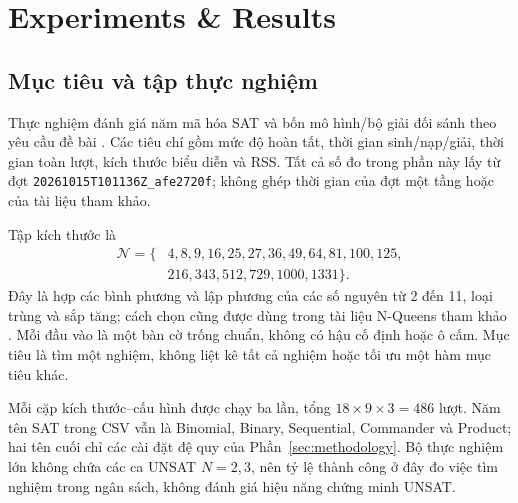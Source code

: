 \section{Experiments \& Results}
\label{sec:experiments}
\subsection{Mục tiêu và tập thực nghiệm}
Thực nghiệm đánh giá năm mã hóa SAT và bốn mô hình/bộ giải đối sánh theo yêu cầu đề bài \citep{assignment}. Các tiêu chí gồm mức độ hoàn tất, thời gian sinh/nạp/giải, thời gian toàn lượt, kích thước biểu diễn và RSS. Tất cả số đo trong phần này lấy từ đợt \texttt{20261015T101136Z\_afe2720f}; không ghép thời gian của đợt một tầng hoặc của tài liệu tham khảo.

Tập kích thước là
\begin{equation}
\begin{split}
\mathcal N=\{&4,8,9,16,25,27,36,49,64,81,100,125,\\
&216,343,512,729,1000,1331\}.
\end{split}
\end{equation}
Đây là hợp các bình phương và lập phương của các số nguyên từ 2 đến 11, loại trùng và sắp tăng; cách chọn cũng được dùng trong tài liệu N-Queens tham khảo \citep{bach2024}. Mỗi đầu vào là một bàn cờ trống chuẩn, không có hậu cố định hoặc ô cấm. Mục tiêu là tìm một nghiệm, không liệt kê tất cả nghiệm hoặc tối ưu một hàm mục tiêu khác.

Mỗi cặp kích thước--cấu hình được chạy ba lần, tổng $18\times9\times3=486$ lượt. Năm tên SAT trong CSV vẫn là Binomial, Binary, Sequential, Commander và Product; hai tên cuối chỉ các cài đặt đệ quy của Phần~\ref{sec:methodology}. Bộ thực nghiệm lớn không chứa các ca UNSAT $N=2,3$, nên tỷ lệ thành công ở đây đo việc tìm nghiệm trong ngân sách, không đánh giá hiệu năng chứng minh UNSAT.

